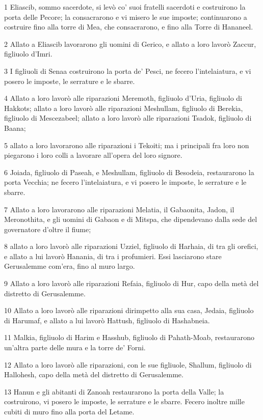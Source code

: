 \par 1 Eliascib, sommo sacerdote, si levò co' suoi fratelli sacerdoti e costruirono la porta delle Pecore; la consacrarono e vi misero le sue imposte; continuarono a costruire fino alla torre di Mea, che consacrarono, e fino alla Torre di Hananeel.
\par 2 Allato a Eliascib lavorarono gli uomini di Gerico, e allato a loro lavorò Zaccur, figliuolo d'Imri.
\par 3 I figliuoli di Senaa costruirono la porta de' Pesci, ne fecero l'intelaiatura, e vi posero le imposte, le serrature e le sbarre.
\par 4 Allato a loro lavorò alle riparazioni Meremoth, figliuolo d'Uria, figliuolo di Hakkots; allato a loro lavorò alle riparazioni Meshullam, figliuolo di Berekia, figliuolo di Mescezabeel; allato a loro lavorò alle riparazioni Tsadok, figliuolo di Baana;
\par 5 allato a loro lavorarono alle riparazioni i Tekoiti; ma i principali fra loro non piegarono i loro colli a lavorare all'opera del loro signore.
\par 6 Joiada, figliuolo di Paseah, e Meshullam, figliuolo di Besodeia, restaurarono la porta Vecchia; ne fecero l'intelaiatura, e vi posero le imposte, le serrature e le sbarre.
\par 7 Allato a loro lavorarono alle riparazioni Melatia, il Gabaonita, Jadon, il Meronothita, e gli uomini di Gabaon e di Mitspa, che dipendevano dalla sede del governatore d'oltre il fiume;
\par 8 allato a loro lavorò alle riparazioni Uzziel, figliuolo di Harhaia, di tra gli orefici, e allato a lui lavorò Hanania, di tra i profumieri. Essi lasciarono stare Gerusalemme com'era, fino al muro largo.
\par 9 Allato a loro lavorò alle riparazioni Refaia, figliuolo di Hur, capo della metà del distretto di Gerusalemme.
\par 10 Allato a loro lavorò alle riparazioni dirimpetto alla sua casa, Jedaia, figliuolo di Harumaf, e allato a lui lavorò Hattush, figliuolo di Hashabneia.
\par 11 Malkia, figliuolo di Harim e Hasshub, figliuolo di Pahath-Moab, restaurarono un'altra parte delle mura e la torre de' Forni.
\par 12 Allato a loro lavorò alle riparazioni, con le sue figliuole, Shallum, figliuolo di Hallohesh, capo della metà del distretto di Gerusalemme.
\par 13 Hanun e gli abitanti di Zanoah restaurarono la porta della Valle; la costruirono, vi posero le imposte, le serrature e le sbarre. Fecero inoltre mille cubiti di muro fino alla porta del Letame.
